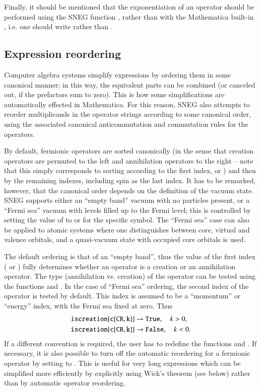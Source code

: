 \documentclass[3p,number,preprint]{elsarticle}
\begin{document}
Finally, it should be mentioned that the exponentiation of
an operator should be performed using the SNEG function , rather
than with the Mathematica built-in , i.e. one should write
 rather than .


\subsection{Expression reordering}

Computer algebra systems simplify expressions by ordering them in some
canonical manner; in this way, the equivalent parts can be combined (or
canceled out, if the prefactors sum to zero). This is how some
simplifications are automatically effected in Mathematica. For this
reason, SNEG also attempts to reorder multiplicands in the 
operator strings according to some canonical order, using the
associated canonical anticommutation and commutation rules for the
operators.

By default, fermionic operators are sorted canonically (in the sense
that creation operators are permuted to the left and annihilation
operators to the right -- note that this simply corresponds to sorting
according to the first index,  or ) and then by
the remaining indexes, including spin as the last index.  It has to be
remarked, however, that the canonical order depends on the definition
of the vacuum state. SNEG supports either an ``empty band'' vacuum
with no particles present, or a ``Fermi sea'' vacuum with levels
filled up to the Fermi level; this is controlled by setting the value
of  to  or  for the specific
symbol. The ``Fermi sea'' case can also be applied to atomic systems
where one distinguishes between core, virtual and valence orbitals,
and a quasi-vacuum state with occupied core orbitals is used.

The default ordering is that of an ``empty band'', thus the value of
the first index ( or ) fully determines whether an
operator is a creation or an annihilation operator. The type
(annihilation vs. creation) of the operator can be tested using the
functions  and . In the case of
``Fermi sea'' ordering, the second index of the operator is tested by
default. This index is assumed to be a ``momentum'' or ``energy''
index, with the Fermi sea fixed at zero. Thus
%
\begin{equation}
\begin{split}
{\tt iscreation[c[CR,k]]} &\to {\tt True},\quad k>0, \\
{\tt iscreation[c[CR,k]]} &\to {\tt False},\quad k<0.
\end{split}
\end{equation}
%
If a different convention is required, the user has to redefine
the functions  and . If necessary, it
is also possible to turn off the automatic reordering for a fermionic
operator by setting  to . This is useful for
very long expressions which can be simplified more efficiently by
explicitly using Wick's theorem (see below) rather than by
automatic operator reordering.
\end{document}
